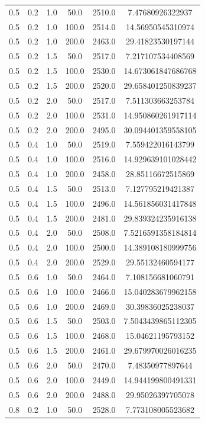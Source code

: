 \begin{tabular}{cccccc}
0.5 & 0.2 & 1.0 & 50.0 & 2510.0 & 7.47680926322937 \\
0.5 & 0.2 & 1.0 & 100.0 & 2514.0 & 14.56950545310974 \\
0.5 & 0.2 & 1.0 & 200.0 & 2463.0 & 29.41823530197144 \\
0.5 & 0.2 & 1.5 & 50.0 & 2517.0 & 7.217107534408569 \\
0.5 & 0.2 & 1.5 & 100.0 & 2530.0 & 14.673061847686768 \\
0.5 & 0.2 & 1.5 & 200.0 & 2520.0 & 29.658401250839237 \\
0.5 & 0.2 & 2.0 & 50.0 & 2517.0 & 7.511303663253784 \\
0.5 & 0.2 & 2.0 & 100.0 & 2531.0 & 14.950860261917114 \\
0.5 & 0.2 & 2.0 & 200.0 & 2495.0 & 30.094401359558105 \\
0.5 & 0.4 & 1.0 & 50.0 & 2519.0 & 7.559422016143799 \\
0.5 & 0.4 & 1.0 & 100.0 & 2516.0 & 14.929639101028442 \\
0.5 & 0.4 & 1.0 & 200.0 & 2458.0 & 28.85116672515869 \\
0.5 & 0.4 & 1.5 & 50.0 & 2513.0 & 7.127795219421387 \\
0.5 & 0.4 & 1.5 & 100.0 & 2496.0 & 14.561856031417848 \\
0.5 & 0.4 & 1.5 & 200.0 & 2481.0 & 29.839324235916138 \\
0.5 & 0.4 & 2.0 & 50.0 & 2508.0 & 7.5216591358184814 \\
0.5 & 0.4 & 2.0 & 100.0 & 2500.0 & 14.389108180999756 \\
0.5 & 0.4 & 2.0 & 200.0 & 2529.0 & 29.55132460594177 \\
0.5 & 0.6 & 1.0 & 50.0 & 2464.0 & 7.108156681060791 \\
0.5 & 0.6 & 1.0 & 100.0 & 2466.0 & 15.040283679962158 \\
0.5 & 0.6 & 1.0 & 200.0 & 2469.0 & 30.39836025238037 \\
0.5 & 0.6 & 1.5 & 50.0 & 2503.0 & 7.5043439865112305 \\
0.5 & 0.6 & 1.5 & 100.0 & 2468.0 & 15.04621195793152 \\
0.5 & 0.6 & 1.5 & 200.0 & 2461.0 & 29.679970026016235 \\
0.5 & 0.6 & 2.0 & 50.0 & 2470.0 & 7.48350977897644 \\
0.5 & 0.6 & 2.0 & 100.0 & 2449.0 & 14.944199800491331 \\
0.5 & 0.6 & 2.0 & 200.0 & 2488.0 & 29.95026397705078 \\
0.8 & 0.2 & 1.0 & 50.0 & 2528.0 & 7.773108005523682 \\

\end{tabular}
